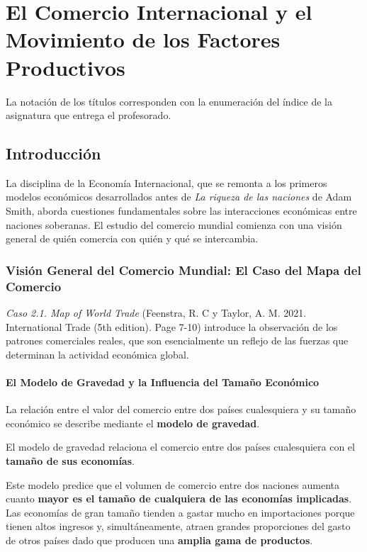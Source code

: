 \chapter{El Comercio Internacional y el Movimiento de los Factores Productivos}

La notación de los títulos corresponden con la enumeración del índice de la asignatura que entrega el profesorado.

\section{Introducción}
La disciplina de la Economía Internacional, que se remonta a los primeros modelos económicos desarrollados antes de \textit{La riqueza de las naciones} de Adam Smith, aborda cuestiones fundamentales sobre las interacciones económicas entre naciones soberanas. El estudio del comercio mundial comienza con una visión general de quién comercia con quién y qué se intercambia.

\subsection{Visión General del Comercio Mundial: El Caso del Mapa del Comercio}
\textit{Caso 2.1. Map of World Trade} (Feenstra, R. C y Taylor, A. M. 2021. International Trade (5th edition). Page 7-10) introduce la observación de los patrones comerciales reales, que son esencialmente un reflejo de las fuerzas que determinan la actividad económica global.

\subsubsection{El Modelo de Gravedad y la Influencia del Tamaño Económico}
La relación entre el valor del comercio entre dos países cualesquiera y su tamaño económico se describe mediante el \textbf{modelo de gravedad}.

\begin{definicion}
El modelo de gravedad relaciona el comercio entre dos países cualesquiera con el \textbf{tamaño de sus economías}.
\end{definicion}

Este modelo predice que el volumen de comercio entre dos naciones aumenta cuanto \textbf{mayor es el tamaño de cualquiera de las economías implicadas}. Las economías de gran tamaño tienden a gastar mucho en importaciones porque tienen altos ingresos y, simultáneamente, atraen grandes proporciones del gasto de otros países dado que producen una \textbf{amplia gama de productos}.

